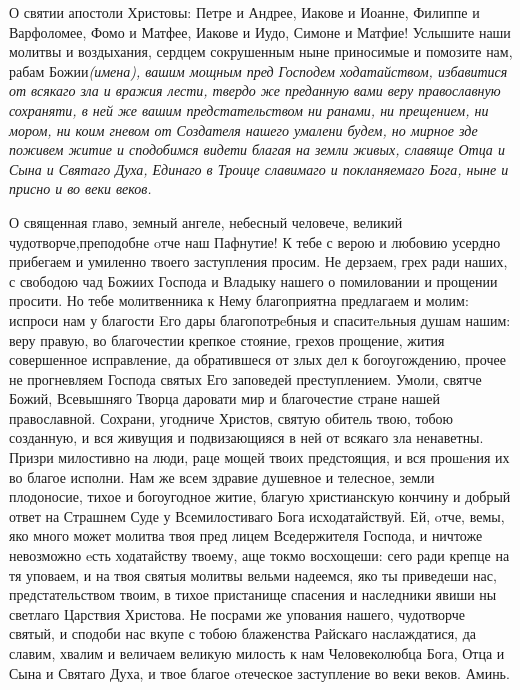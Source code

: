 

\label{_content_molitvi-svyatim}

 

 



 О святии апостоли Христовы: Петре и  Андрее, Иакове и Иоанне, Филиппе и Варфоломее, Фомо и Матфее, Иакове и Иудо, Симоне и Матфие! Услышите наши молитвы и воздыхания, сердцем сокрушенным  ныне приносимые и помозите нам, рабам Божии\itshape  (имена\normalfont{}), вашим мощным пред Господем ходатайством, избавитися от всякаго зла и вражия лести, твердо же преданную вами веру православную сохраняти, в ней же вашим предстательством ни ранами, ни прещением, ни мором, ни коим гневом  от Создателя нашего умалени будем, но мирное зде поживем житие и сподобимся видети благая на земли живых, славяще Отца и Сына и Святаго Духа, Единаго в Троице славимаго и покланяемаго Бога, ныне и присно и во веки веков.
\mychapterending

 



О священная главо, земный ангеле, небесный человече, великий чудотворче,преподобне oтче наш Пафнутие! К тебе с верою и любовию усердно прибегаем и умиленно твоего заступления просим. Не дерзаем, грех ради наших, с свободою чад Божиих Господа и Владыку нашего о помиловании и прощении просити. Но тебе молитвенника к Нему благоприятна предлагаем и молим: испроси нам у благости Eго дары благопотрeбныя и спаситeльныя душам нашим: веру правую, во благочестии крепкое стояние, грехов прощение, жития совершенное исправление, да обратившеся от злых дел к богоугождению, прочее не прогневляем Господа святых Его заповедей преступлением. Умоли, святче Божий, Всевышняго Творца даровати мир и благочестие стране нашей православной. Сохрани, угодниче Христов, святую обитель твою, тобою созданную, и вся живущия и подвизающияся в ней от всякаго зла ненаветны. Призри милостивно на люди, раце мощей твоих предстоящия, и вся прошeния их во благое исполни. Нам же всем здравие душевное и телесное, земли плодоносие, тихое и богоугодное житие, благую христианскую кончину и добрый ответ на Страшнем Суде у Всемилостиваго Бога исходатайствуй. Ей, oтче, вемы, яко много может молитва твоя пред лицем Вседержителя Господа, и ничтоже невозможно eсть ходатайству твоему, аще токмо восхощеши: сего ради крепце на тя уповаем, и на твоя святыя молитвы вельми надеемся, яко ты приведеши нас, предстательством твоим, в тихое пристанище спасения и наследники явиши ны светлаго Царствия Христова. Не посрами же упования нашего, чудотворче святый, и сподоби нас вкупе с тобою блаженства Райскаго наслаждатися, да славим, хвалим и величаем великую милость к нам Человеколюбца Бога, Отца и Сына и Святаго Духа, и твое благое oтеческое заступление во веки веков. Аминь.
\mychapterending

